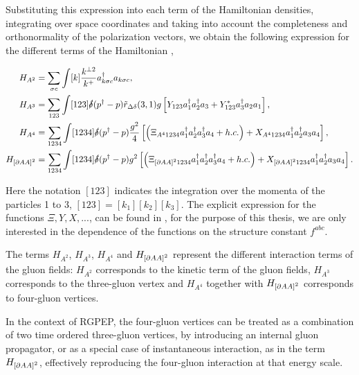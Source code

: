 \documentclass[11pt,a4paper,twoside,pdf]{article}
\numberwithin{equation}{section}
\begin{document}
Substituting this expression into each term of the Hamiltonian densities, integrating
over space coordinates and taking into account the completeness and orthonormality 
of the polarization vectors, we obtain the following expression for the different
terms of the Hamiltonian \cite{QCDG}, 

\begin{align}
    H_{A^2} &= \sum_{\sigma c} \int [k] \frac{k^{\perp 2}}{k^+}a^\dagger_{k\sigma c}
    a_{k\sigma c}, \label{eq:H_A^2}\\
    H_{A^3} &= \sum_{123} \int [123] \slashed{\delta}(p^\dagger - p) \tilde{r}_{\Delta \delta}
    (3, 1) g\left[ Y_{123}a_1^\dagger a_2^\dagger a_3 + Y_{123}^*a_3^\dagger a_2 a_1 \right],
    \label{eq:H_A^3}\\
    H_{A^4} &= \sum_{1234} \int [1234] \slashed{\delta}(p^\dagger - p) \frac{g^2}{4}
    \left[ \left( \Xi_{A^4 1234} a_1^\dagger a_2^\dagger a_3^\dagger a_4 + h.c. \right)+ X_{A^4 1234} 
    a_1^\dagger a_2^\dagger a_3 a_4  \right], \label{eq:H_A^4}\\
    H_{\left[ \partial A A \right]^2} &= \sum_{1234} \int [1234] \slashed{\delta}
    (p^\dagger - p) g^2 \left[ \left( \Xi_{\left[ \partial A A \right]^2 1234}
    a_1^\dagger a_2^\dagger a_3^\dagger a_4 + h.c. \right) + X_{\left[ \partial A A \right]^2 
    1234} a_1^\dagger a_2^\dagger a_3 a_4  \right] \label{eq:H_partial}.
\end{align}

Here the notation $[123]$ indicates the integration over the momenta of
the particles 1 to 3, $[123] = [k_1][k_2][k_3]$. The explicit expression for the 
functions $\Xi, Y, X, ...$, can be found in \cite{QCDG}, for 
the purpose of this thesis, we are only interested in the dependence of the functions 
on the structure constant $f^{abc}$. 

The terms $H_{A^2}$, $H_{A^3}$, $H_{A^4}$ and $H_{\left[ \partial A A \right]^2}$
represent the different interaction terms of the gluon fields: $H_{A^2}$ corresponds to 
the kinetic term of the gluon fields, $H_{A^3}$ corresponds to the three-gluon
vertex and  $H_{A^4}$ together with $H_{\left[ \partial A A \right]^2}$ corresponds to
four-gluon vertices. 

In the context of RGPEP, the four-gluon vertices can be treated as a combination of two
time ordered
three-gluon vertices, by introducing an internal gluon propagator, or as a
special case of instantaneous interaction, as in the term $H_{\left[ \partial A A \right]^2}$, 
effectively reproducing the four-gluon interaction at that energy scale. 
\end{document}
